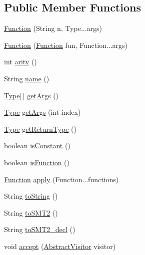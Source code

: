 \subsection*{Public Member Functions}
\begin{DoxyCompactItemize}
\item 
\hyperlink{classuran_1_1formula_1_1_function_abab40ed046111627cab8d93b2780da11}{Function} (String n, Type...\+args)
\item 
\hyperlink{classuran_1_1formula_1_1_function_a8798b4f02f197741361be6596dc8f0f5}{Function} (\hyperlink{classuran_1_1formula_1_1_function}{Function} fun, Function...\+args)
\item 
int \hyperlink{classuran_1_1formula_1_1_function_a615e9611d49db496dcd3f74550a220cb}{arity} ()
\item 
String \hyperlink{classuran_1_1formula_1_1_function_acd825466dceed6c2d677895d9e156c27}{name} ()
\item 
\hyperlink{classuran_1_1formula_1_1type_1_1_type}{Type}\mbox{[}$\,$\mbox{]} \hyperlink{classuran_1_1formula_1_1_function_a48b08ecb2b2594ba31c63df397022e65}{get\+Args} ()
\item 
\hyperlink{classuran_1_1formula_1_1type_1_1_type}{Type} \hyperlink{classuran_1_1formula_1_1_function_ae44d77eca56a3d932e06715b8129ffd5}{get\+Args} (int index)
\item 
\hyperlink{classuran_1_1formula_1_1type_1_1_type}{Type} \hyperlink{classuran_1_1formula_1_1_function_a1284d625f45b675f2819578b1fea8fbe}{get\+Return\+Type} ()
\item 
boolean \hyperlink{classuran_1_1formula_1_1_function_a2cfe351a2f060618cbe571342b64e662}{is\+Constant} ()
\item 
boolean \hyperlink{classuran_1_1formula_1_1_function_ac06a993807911137fb8099bc0d3cc4e9}{is\+Function} ()
\item 
\hyperlink{classuran_1_1formula_1_1_function}{Function} \hyperlink{classuran_1_1formula_1_1_function_a39bab5b0fa754e4a24e2655f8003e32f}{apply} (Function...\+functions)
\item 
String \hyperlink{classuran_1_1formula_1_1_function_a118f8a1eaff250ed8ccc31603129bc0e}{to\+String} ()
\item 
String \hyperlink{classuran_1_1formula_1_1_function_a667a61d9acbae47f9de11ad8b354269c}{to\+S\+M\+T2} ()
\item 
String \hyperlink{classuran_1_1formula_1_1_function_af33e0ca53f19882649241248946a7f66}{to\+S\+M\+T2\+\_\+decl} ()
\item 
void \hyperlink{classuran_1_1formula_1_1_function_a36588b7e90d80b1a316c357b6099373b}{accept} (\hyperlink{classuran_1_1formula_1_1visitor_1_1_abstract_visitor}{Abstract\+Visitor} visitor)
\end{DoxyCompactItemize}


